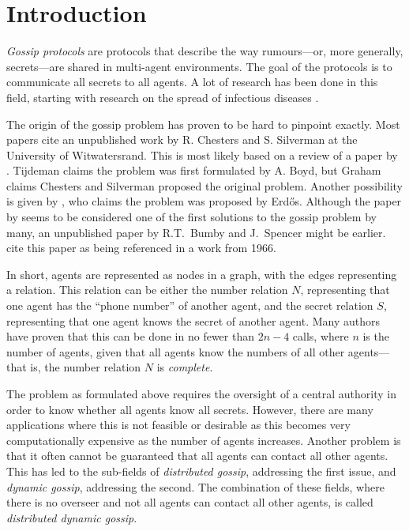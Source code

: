 
\section{Introduction}
\label{sec:introduction}

\textit{Gossip protocols} are protocols that describe the way rumours---or, more generally, secrets---are shared in multi-agent environments.
The goal of the protocols is to communicate all secrets to all agents.
A lot of research has been done in this field, 
starting with research on the spread of infectious diseases \parencite{kermack_contribution_1927}.

The origin of the gossip problem has proven to be hard to pinpoint exactly.
Most papers cite an unpublished work by R. Chesters and S. Silverman at the University of Witwatersrand.
This is most likely based on a review \parencite{graham_review_1972} of a paper by \textcite{tijdeman_telephone_1971}.
Tijdeman claims the problem was first formulated by A. Boyd, but Graham claims Chesters and Silverman proposed the original problem.
Another possibility is given by \textcite{lebensold_efficient_1973}, who claims the problem was proposed by Erd\H{o}s.
Although the paper by \citeauthor{tijdeman_telephone_1971} seems to be considered one of the first solutions to the gossip problem by many,
an unpublished paper by R.T.~Bumby and J.~Spencer might be earlier. 
\textcite{harary_communication_1974} cite this paper as being referenced in a work from 1966.

In short, agents are represented as nodes in a graph, with the edges representing a relation.
This relation can be either the number relation \(N\), representing that one agent has the ``phone number'' of another agent,
and the secret relation \(S\), representing that one agent knows the secret of another agent.
Many authors \parencite[e.g.][]{tijdeman_telephone_1971, hajnal_cure_1972, baker_gossips_1972, lebensold_efficient_1973} have proven that this can be done in no fewer than \(2n-4\) calls,
where \(n\) is the number of agents,
given that all agents know the numbers of all other agents---that is, the number relation \(N\) is \textit{complete}.

The problem as formulated above requires the oversight of a central authority in order to know whether all agents know all secrets.
However, there are many applications where this is not feasible or desirable as this becomes very computationally expensive as the number of agents increases.
Another problem is that it often cannot be guaranteed that all agents can contact all other agents.
This has led to the sub-fields of \textit{distributed gossip}, addressing the first issue, and \textit{dynamic gossip}, addressing the second.
The combination of these fields, where there is no overseer and not all agents can contact all other agents, is called \textit{distributed dynamic gossip}.

